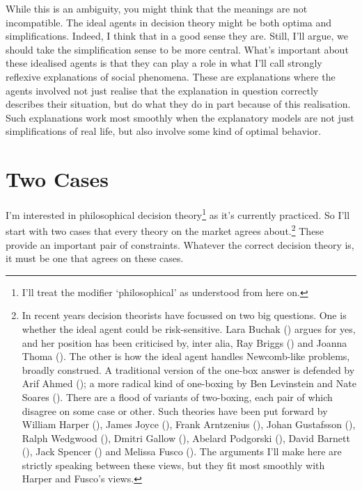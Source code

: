 \documentclass[
  10pt,
  letterpaper,
  DIV=11,
  numbers=noendperiod,
  twoside]{scrartcl}
\begin{document}
While this is an ambiguity, you might think that the meanings are not
incompatible. The ideal agents in decision theory might be both optima
and simplifications. Indeed, I think that in a good sense they are.
Still, I'll argue, we should take the simplification sense to be more
central. What's important about these idealised agents is that they can
play a role in what I'll call strongly reflexive explanations of social
phenomena. These are explanations where the agents involved not just
realise that the explanation in question correctly describes their
situation, but do what they do in part because of this realisation. Such
explanations work most smoothly when the explanatory models are not just
simplifications of real life, but also involve some kind of optimal
behavior.

\section{Two Cases}\label{two-cases}

I'm interested in philosophical decision theory\footnote{I'll treat the
  modifier `philosophical' as understood from here on.} as it's
currently practiced. So I'll start with two cases that every theory on
the market agrees about.\footnote{In recent years decision theorists
  have focussed on two big questions. One is whether the ideal agent
  could be risk-sensitive. Lara Buchak ()
  argues for yes, and her position has been criticised by, inter alia,
  Ray Briggs () and Joanna Thoma
  (). The other is how the ideal agent
  handles Newcomb-like problems, broadly construed. A traditional
  version of the one-box answer is defended by Arif Ahmed
  (); a more radical kind of one-boxing by
  Ben Levinstein and Nate Soares
  (). There are a flood of
  variants of two-boxing, each pair of which disagree on some case or
  other. Such theories have been put forward by William Harper
  (), James Joyce
  (), Frank Arntzenius
  (), Johan Gustafsson
  (), Ralph Wedgwood
  (), Dmitri Gallow
  (), Abelard Podgorski
  (), David Barnett
  (), Jack Spencer
  () and Melissa Fusco
  (). The arguments I'll make here are
  strictly speaking between these views, but they fit most smoothly with
  Harper and Fusco's views.} These provide an important pair of
constraints. Whatever the correct decision theory is, it must be one
that agrees on these cases.
\end{document}
